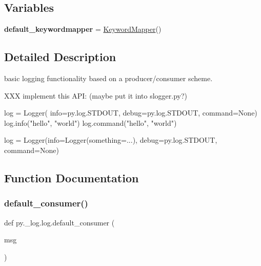 \subsection*{Variables}
\begin{DoxyCompactItemize}
\item 
\mbox{\label{namespacepy_1_1__log_1_1log_aa0794e75e3f9dd0784395a17f06a8fee}} 
{\bfseries default\+\_\+keywordmapper} = \hyperlink{classpy_1_1__log_1_1log_1_1_keyword_mapper}{Keyword\+Mapper}()
\end{DoxyCompactItemize}


\subsection{Detailed Description}
\begin{DoxyVerb}basic logging functionality based on a producer/consumer scheme.

XXX implement this API: (maybe put it into slogger.py?)

log = Logger(
            info=py.log.STDOUT,
            debug=py.log.STDOUT,
            command=None)
log.info("hello", "world")
log.command("hello", "world")

log = Logger(info=Logger(something=...),
             debug=py.log.STDOUT,
             command=None)
\end{DoxyVerb}
 

\subsection{Function Documentation}
\mbox{\label{namespacepy_1_1__log_1_1log_a1057ab2ad3a0224ea93a79d090bde3bd}} 
\subsubsection{\texorpdfstring{default\+\_\+consumer()}{default\_consumer()}}
{\footnotesize\ttfamily def py.\+\_\+log.\+log.\+default\+\_\+consumer (\begin{DoxyParamCaption}\item[{}]{msg }\end{DoxyParamCaption})}

